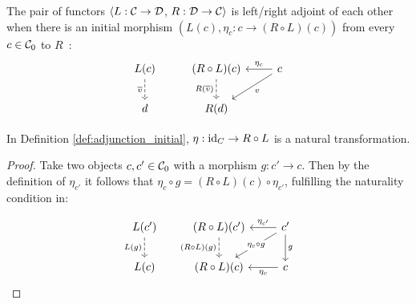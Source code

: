 \begin{definition}
  The pair of functors $\langle L: \mathcal{C}\to \mathcal{D}$, $R: \mathcal{D}\to \mathcal{C}\rangle$ is left/right adjoint of
  each other when there is an initial morphism $(L(c), \eta_c:c\to (R\circ
  L)(c))$ from every $c\in \mathcal{C}_0$ to $R$~\parencite{awodey:category_theory}:
  \[\begin{tikzcd}[ampersand replacement=\&]
    {L(c)} \& {(R\circ L)(c)} \& c \\
    d \& {R(d)}
    \arrow["{\overline{v}}"', dashed, from=1-1, to=2-1]
    \arrow["{R(\overline{v})}"', dashed, from=1-2, to=2-2]
    \arrow["v", from=1-3, to=2-2]
    \arrow["{\eta_c}"', from=1-3, to=1-2]
  \end{tikzcd}\]
\end{definition}

\begin{theorem}
  In Definition \ref{def:adjunction_initial}, $\eta:\mathrm{id}_C \to R\circ L$ is a
  natural transformation.

  \begin{proof}
    Take two objects $c,c'\in \mathcal{C}_0$ with a morphism $g:c'\to c$. Then by the
    definition of $\eta_{c'}$ it follows that $\eta_c\circ g = (R\circ
    L)(c)\circ \eta_{c'}$, fulfilling the naturality condition in:

    \[\begin{tikzcd}[ampersand replacement=\&]
      {L(c')} \& {(R\circ L)(c')} \& {c'} \\
      {L(c)} \& {(R\circ L)(c)} \& c
      \arrow["{\eta_c}", from=2-3, to=2-2]
      \arrow["{\eta_{c'}}"', from=1-3, to=1-2]
      \arrow["g", from=1-3, to=2-3]
      \arrow["{(R\circ L)(g)}"', dashed, from=1-2, to=2-2]
      \arrow["{L(g)}"', dashed, from=1-1, to=2-1]
      \arrow["{\eta_c\circ g}"{description}, from=1-3, to=2-2]
    \end{tikzcd}\]
  \end{proof}
\end{theorem}

